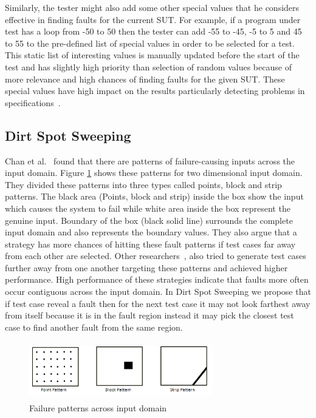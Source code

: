 \documentclass{acm_proc_article-sp}
\begin{document}
Similarly, the tester might also add some other special values that he considers effective in finding faults for the current SUT. For example, if a program under test has a loop from -50 to 50 then the tester can add -55 to -45, -5 to 5 and 45 to 55 to the pre-defined list of special values in order to be selected for a test. This static list of interesting values is manually updated before the start of the test and has slightly high priority than selection of random values because of more relevance and high chances of finding faults for the given SUT. These special values have high impact on the results particularly detecting problems in specifications~\cite{Ciupa2008}.


\subsection{Dirt Spot Sweeping}
Chan et al.~\cite{Chan1996} found that there are patterns of failure-causing inputs across the input domain. Figure \ref{fig:patterns} shows these patterns for two dimensional input domain. They divided these patterns into three types called points, block and strip patterns. The black area (Points, block and strip) inside the box show the input which causes the system to fail while white area inside the box represent the genuine input. Boundary of the box (black solid line) surrounds the complete input domain and also represents the boundary values. They also argue that a strategy has more chances of hitting these fault patterns if test cases far away from each other are selected. Other researchers~\cite{Chan2002, Chen2003, Chen2005}, also tried to generate test cases further away from one another targeting these patterns and achieved higher performance. High performance of these strategies indicate that faults more often occur contiguous across the input domain. In Dirt Spot Sweeping we propose that if test case reveal a fault then for the next test case it may not look farthest away from itself because it is in the fault region instead it may pick the closest test case to find another fault from the same region.

\begin{figure}[ht]                                    
\centering
\includegraphics[width= 8cm,height=2.5cm]{ART_Patterns.png}
\caption{Failure patterns across input domain~\cite{Chen2008}}
\label{fig:patterns}
\end{figure}
\end{document}

